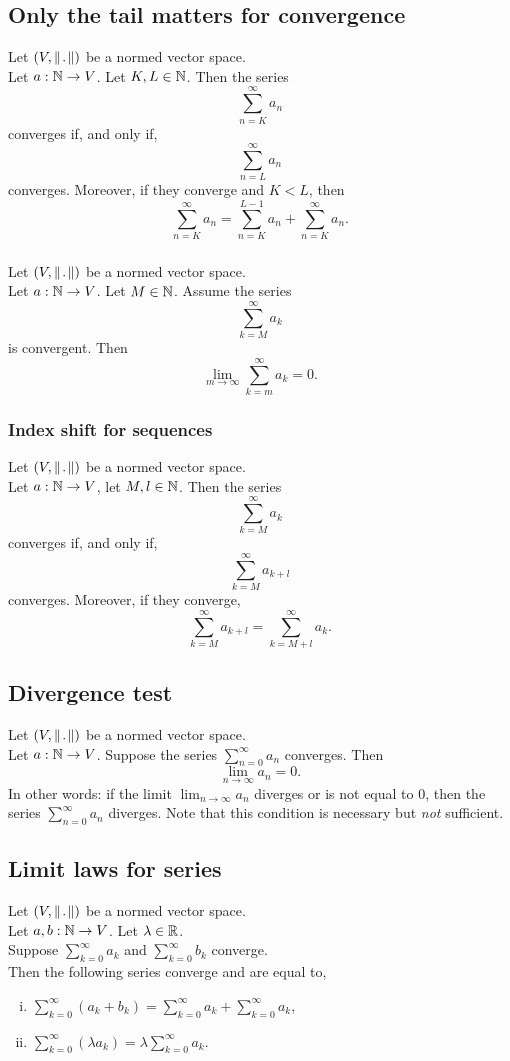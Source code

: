 \subsection{Only the tail matters for convergence}
\uprop Let $(V, \norm)$ be a normed vector space.\\
Let $a : \mathbb{N} \to V$. Let $K,L \in \mathbb{N}$. Then the series
\[
    \sum_{n=K}^{\infty} a_n
\]
converges if, and only if,
\[
    \sum_{n=L}^{\infty} a_n
\]
converges. Moreover, if they converge and $K < L$, then
\[
    \sum_{n=K}^{\infty} a_n = \sum_{n=K}^{L-1} a_n + \sum_{n=K}^{\infty} a_n.
\]

\subsubsection*{}
\uprop Let $(V, \norm)$ be a normed vector space.\\
Let $a : \mathbb{N} \to V$. Let $M \in \mathbb{N}$. Assume the series
\[
    \sum_{k=M}^{\infty} a_k
\]
is convergent. Then
\[
    \lim_{m \to \infty} \sum_{k=m}^{\infty} a_k = 0.
\]

\subsubsection*{Index shift for sequences}
Let $(V, \norm)$ be a normed vector space.\\
Let $a : \mathbb{N} \to V$, let $M, l \in \mathbb{N}$. Then the series
\[
    \sum_{k=M}^{\infty} a_k
\]
converges if, and only if,
\[
    \sum_{k=M}^{\infty} a_{k+l}
\]
converges. Moreover, if they converge,
\[
    \sum_{k=M}^{\infty} a_{k+l} = \sum_{k=M+l}^{\infty} a_k.
\]


\subsection{Divergence test}
\uthm Let $(V, \norm)$ be a normed vector space.\\
Let $a : \mathbb{N} \to V$. Suppose the series $\sum_{n=0}^{\infty} a_n$ converges.
Then
\[
    \lim_{n \to \infty} a_n = 0.
\]
In other words: if the limit $\lim_{n \to \infty} a_n$ diverges or is not
equal to $0$, then the series $\sum_{n=0}^{\infty} a_n$ diverges.
Note that this condition is necessary but \emph{not} sufficient.


\subsection{Limit laws for series}
\uthm Let $(V, \norm)$ be a normed vector space.\\
Let $a,b : \mathbb{N} \to V$. Let $\lambda \in \mathbb{R}$.\\
Suppose $\sum_{k=0}^{\infty} a_k$ and $\sum_{k=0}^{\infty} b_k$ converge.\\
Then the following series converge and are equal to,
\begin{enumerate}[(i)]
    \item $\sum_{k=0}^{\infty} (a_k + b_k) = \sum_{k=0}^{\infty} a_k + \sum_{k=0}^{\infty} a_k$,
    \item $\sum_{k=0}^{\infty} (\lambda a_k) = \lambda \sum_{k=0}^{\infty} a_k$.
\end{enumerate}